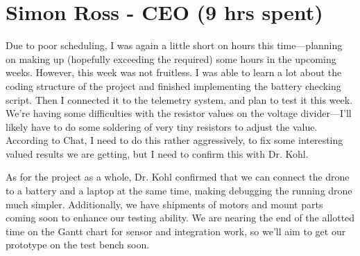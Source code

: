 \documentclass[12pt, titlepage]{article}
\begin{document}
\section*{Simon Ross - CEO (9 hrs spent)}

Due to poor scheduling, I was again a little short on hours this time---planning on making up (hopefully exceeding the required) some hours in the upcoming weeks. However, this week was not fruitless. I was able to learn a lot about the coding structure of the project and finished implementing the battery checking script. Then I connected it to the telemetry system, and plan to test it this week. We're having some difficulties with the resistor values on the voltage divider---I'll likely have to do some soldering of very tiny resistors to adjust the value. According to Chat, I need to do this rather aggressively, to fix some interesting valued results we are getting, but I need to confirm this with Dr. Kohl.

As for the project as a whole, Dr. Kohl confirmed that we can connect the drone to a battery and a laptop at the same time, making debugging the running drone much simpler. Additionally, we have shipments of motors and mount parts coming soon to enhance our testing ability. We are nearing the end of the allotted time on the Gantt chart for sensor and integration work, so we'll aim to get our prototype on the test bench soon.
\end{document}
